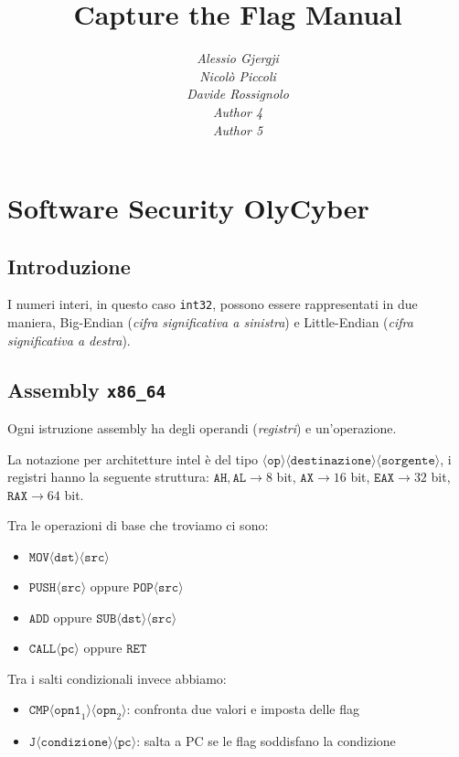 \documentclass[oneside,a4paper,11pt]{book}
\title{Capture the Flag Manual}
\author{
\textit{Alessio Gjergji}\\
\textit{Nicolò Piccoli} \\
\textit{Davide Rossignolo} \\
\textit{Author 4} \\
\textit{Author 5}}
\date{}
\theoremstyle{italicstyle}
\theoremstyle{normStyle}
\begin{document}
\maketitle
\tableofcontents
\chapter{Software Security OlyCyber}
\section{Introduzione}
I numeri interi, in questo caso \texttt{int32}, possono essere rappresentati
in due maniera, Big-Endian (\textit{cifra significativa a sinistra}) e
Little-Endian (\textit{cifra significativa a destra}).
\section{Assembly \texttt{x86\_64}}
Ogni istruzione assembly ha degli operandi (\textit{registri}) e un'operazione.

La notazione per architetture intel è del tipo  $\langle \texttt{op} \rangle
\langle \texttt{destinazione} \rangle \langle \texttt{sorgente} \rangle$,
i registri hanno la seguente struttura:
$\texttt{AH},\texttt{AL} \rightarrow 8$ bit,
$\texttt{AX} \rightarrow 16$ bit,
$\texttt{EAX} \rightarrow 32$ bit,
$\texttt{RAX} \rightarrow 64$ bit.

Tra le operazioni di base che troviamo ci sono: 
\begin{itemize}
    \item $\texttt{MOV} \langle \texttt{dst}\rangle\langle \texttt{src}\rangle$
    \item $\texttt{PUSH} \langle \texttt{src}\rangle$ oppure $\texttt{POP}\langle \texttt{src}\rangle$
    \item $\texttt{ADD}$ oppure $\texttt{SUB} \langle \texttt{dst}\rangle\langle \texttt{src}\rangle$
    \item $\texttt{CALL} \langle \texttt{pc}\rangle$ oppure $\texttt{RET}$
\end{itemize}
Tra i salti condizionali invece abbiamo:
\begin{itemize}
    \item $\texttt{CMP} \langle \texttt{opn1}_1\rangle\langle \texttt{opn}_2\rangle$: confronta due valori e imposta delle flag
    \item $\texttt{J} \langle \texttt{condizione}\rangle\langle \texttt{pc}\rangle$: salta a PC se le flag soddisfano la condizione
\end{itemize}
\end{document}
